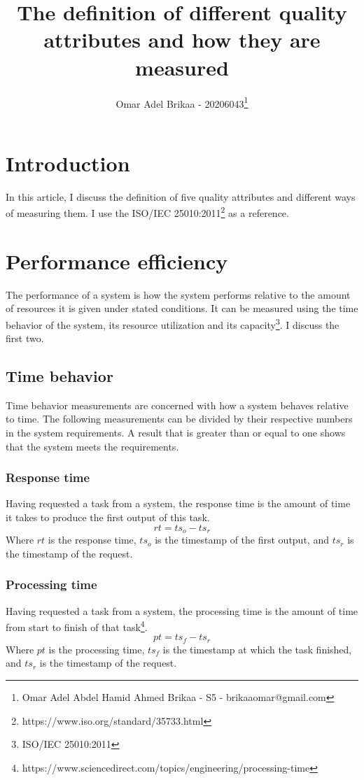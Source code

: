 \documentclass[11pt,a4paper]{article}
\def \iso{\footnote{ISO/IEC 25010:2011}}
\begin{document}
\title{The definition of different quality attributes and how they are measured}
\author{Omar Adel Brikaa - 20206043\thanks{Omar Adel Abdel Hamid Ahmed Brikaa - S5 - brikaaomar@gmail.com}}
\date{}
\maketitle

\tableofcontents

\section{Introduction}
In this article, I discuss the definition of five quality attributes and different ways of measuring them. I use the
ISO/IEC 25010:2011\footnote{\label{iso}https://www.iso.org/standard/35733.html} as a reference.

\section{Performance efficiency}
The performance of a system is how the system performs relative to the amount of resources it is given
under stated conditions. It can be measured using the time behavior of the system, its resource utilization and its
capacity\iso. I discuss the first two.

\subsection{Time behavior}
Time behavior measurements are concerned with how a system behaves relative to time.
The following measurements can be divided by their respective numbers in the system requirements.
A result that is greater than or equal to one shows that the system meets the requirements.

\subsubsection{Response time}
Having requested a task from a system, the response time is the amount of time it takes
to produce the first output of this task.
\[rt = ts_o - ts_r\]
Where $rt$ is the response time, $ts_o$ is the timestamp of the first output, and $ts_r$ is the timestamp of the request.

\subsubsection{Processing time}
Having requested a task from a system, the processing time is the amount of time from start to finish of that
task\footnote{https://www.sciencedirect.com/topics/engineering/processing-time}.
\[pt = ts_f - ts_r\]
Where $pt$ is the processing time, $ts_f$ is the timestamp at which the task finished,
and $ts_r$ is the timestamp of the request.
\end{document}
